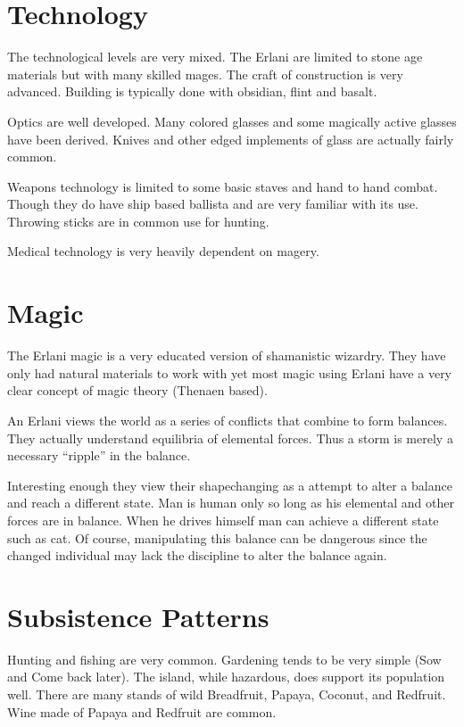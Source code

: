 \section{Technology}

The technological levels are very mixed. The Erlani are limited to
stone age materials but with many skilled mages. The craft of construction
is very advanced. Building is typically done with obsidian, flint and basalt. 

Optics are well developed. Many colored glasses and some magically active glasses
have been derived. Knives and other edged implements of glass are actually 
fairly common.

Weapons technology is limited to
some basic staves and hand to hand combat. Though they do have ship based ballista
and are very familiar with its use. Throwing sticks are in common use for hunting.

Medical technology is very heavily dependent on magery. 

\section{Magic}

The Erlani magic is a very educated version of shamanistic wizardry. They
have only had natural materials to work with yet most magic using Erlani
have a very clear concept of magic theory (Thenaen based).

An Erlani views the world as a series of conflicts that combine to form
balances. They actually understand equilibria of elemental forces. Thus a 
storm is merely a necessary ``ripple'' in the balance. 

Interesting enough they view their shapechanging as a attempt to
alter a balance and reach a different state. Man is human only so 
long as his elemental and other forces are in balance. When he drives
himself man can achieve a different state such as cat. Of course,
manipulating this balance can be dangerous since the changed individual may
lack the discipline to alter the balance again. 

\section{Subsistence Patterns}

Hunting and fishing are very common. Gardening tends to be very
simple (Sow and Come back later). The island, while hazardous, does
support its population well. There are many stands of wild Breadfruit, 
Papaya, Coconut, and Redfruit. Wine made of Papaya and Redfruit are common.

